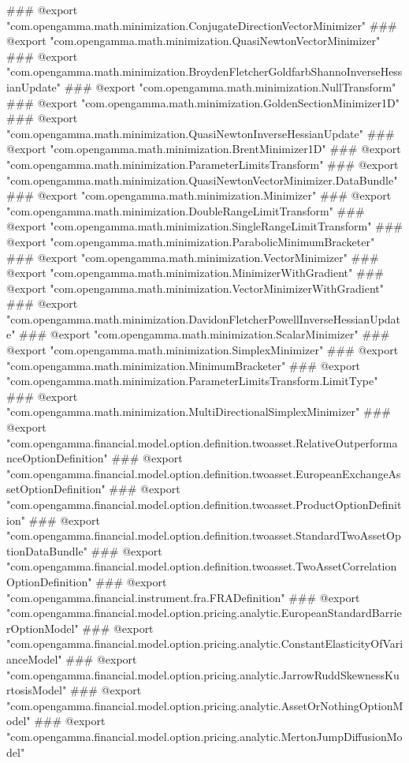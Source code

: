 ### @export "com.opengamma.math.minimization.ConjugateDirectionVectorMinimizer"
### @export "com.opengamma.math.minimization.QuasiNewtonVectorMinimizer"
### @export "com.opengamma.math.minimization.BroydenFletcherGoldfarbShannoInverseHessianUpdate"
### @export "com.opengamma.math.minimization.NullTransform"
### @export "com.opengamma.math.minimization.GoldenSectionMinimizer1D"
### @export "com.opengamma.math.minimization.QuasiNewtonInverseHessianUpdate"
### @export "com.opengamma.math.minimization.BrentMinimizer1D"
### @export "com.opengamma.math.minimization.ParameterLimitsTransform"
### @export "com.opengamma.math.minimization.QuasiNewtonVectorMinimizer.DataBundle"
### @export "com.opengamma.math.minimization.Minimizer"
### @export "com.opengamma.math.minimization.DoubleRangeLimitTransform"
### @export "com.opengamma.math.minimization.SingleRangeLimitTransform"
### @export "com.opengamma.math.minimization.ParabolicMinimumBracketer"
### @export "com.opengamma.math.minimization.VectorMinimizer"
### @export "com.opengamma.math.minimization.MinimizerWithGradient"
### @export "com.opengamma.math.minimization.VectorMinimizerWithGradient"
### @export "com.opengamma.math.minimization.DavidonFletcherPowellInverseHessianUpdate"
### @export "com.opengamma.math.minimization.ScalarMinimizer"
### @export "com.opengamma.math.minimization.SimplexMinimizer"
### @export "com.opengamma.math.minimization.MinimumBracketer"
### @export "com.opengamma.math.minimization.ParameterLimitsTransform.LimitType"
### @export "com.opengamma.math.minimization.MultiDirectionalSimplexMinimizer"
### @export "com.opengamma.financial.model.option.definition.twoasset.RelativeOutperformanceOptionDefinition"
### @export "com.opengamma.financial.model.option.definition.twoasset.EuropeanExchangeAssetOptionDefinition"
### @export "com.opengamma.financial.model.option.definition.twoasset.ProductOptionDefinition"
### @export "com.opengamma.financial.model.option.definition.twoasset.StandardTwoAssetOptionDataBundle"
### @export "com.opengamma.financial.model.option.definition.twoasset.TwoAssetCorrelationOptionDefinition"
### @export "com.opengamma.financial.instrument.fra.FRADefinition"
### @export "com.opengamma.financial.model.option.pricing.analytic.EuropeanStandardBarrierOptionModel"
### @export "com.opengamma.financial.model.option.pricing.analytic.ConstantElasticityOfVarianceModel"
### @export "com.opengamma.financial.model.option.pricing.analytic.JarrowRuddSkewnessKurtosisModel"
### @export "com.opengamma.financial.model.option.pricing.analytic.AssetOrNothingOptionModel"
### @export "com.opengamma.financial.model.option.pricing.analytic.MertonJumpDiffusionModel"
